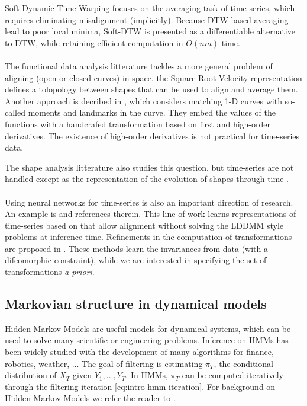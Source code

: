 Soft-Dynamic Time Warping focuses on the averaging task of time-series, which requires eliminating misalignment (implicitly). Because DTW-based averaging lead to poor local minima, Soft-DTW is presented as a differentiable alternative to DTW, while retaining efficient computation in $O(nm)$ time.

\paragraph{}
The functional data analysis litterature tackles a more general problem of aligning (open or closed curves) in space. \cite{srvf} the Square-Root Velocity representation defines a tolopology between shapes that can be used to align and average them. Another approach is decribed in \cite{0712.1425}, which considers matching 1-D curves with so-called moments and landmarks in the curve. They embed the values of the functions with a handcrafed transformation based on first and high-order derivatives. The existence of high-order derivatives is not practical for time-series data.

The shape analysis litterature also studies this question, but time-series are not handled except as the representation of the evolution of shapes through time \citep{2108.05634,hal-00813825}.

\paragraph{} Using neural networks for time-series is also an important direction of research. An example is \cite{2106.11911,dtan} and references therein. This line of work learns representations of time-series based on \cite{pavf} that allow alignment without solving the LDDMM style problems at inference time. Refinements in the computation of transformations are proposed in \cite{2206.08107}. These methods learn the invariances from data (with a difeomorphic constraint), while we are interested in specifying the set of transformations \emph{a priori}.

\subsection{Markovian structure in dynamical models}
Hidden Markov Models are useful models for dynamical systems, which can be used to solve many scientific or engineering problems. Inference on HMMs has been widely studied with the development of many algorithms for finance, robotics, weather, ... \cite{ref} The goal of filtering is estimating $\pi_T$, the conditional distribution of $X_T$ given $Y_1, \ldots, Y_T$. In HMMs, $\pi_T$ can be computed iteratively through the filtering iteration \cref{eq:intro-hmm-iteration}. For background on Hidden Markov Models we refer the reader to \cite{cappe2005}.

